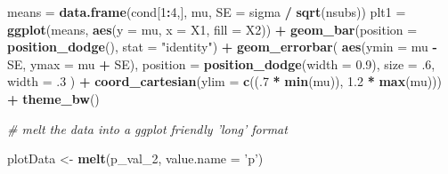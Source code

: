 \documentclass[]{book}
\newenvironment{Shaded}{\begin{snugshade}}{\end{snugshade}}
\newcommand{\CommentTok}[1]{\textcolor[rgb]{0.56,0.35,0.01}{\textit{#1}}}
\newcommand{\DataTypeTok}[1]{\textcolor[rgb]{0.13,0.29,0.53}{#1}}
\newcommand{\DecValTok}[1]{\textcolor[rgb]{0.00,0.00,0.81}{#1}}
\newcommand{\FloatTok}[1]{\textcolor[rgb]{0.00,0.00,0.81}{#1}}
\newcommand{\KeywordTok}[1]{\textcolor[rgb]{0.13,0.29,0.53}{\textbf{#1}}}
\newcommand{\NormalTok}[1]{#1}
\newcommand{\OperatorTok}[1]{\textcolor[rgb]{0.81,0.36,0.00}{\textbf{#1}}}
\newcommand{\StringTok}[1]{\textcolor[rgb]{0.31,0.60,0.02}{#1}}
\begin{document}
\begin{Shaded}
\begin{Highlighting}[]
\NormalTok{means =}\StringTok{ }\KeywordTok{data.frame}\NormalTok{(cond[}\DecValTok{1}\OperatorTok{:}\DecValTok{4}\NormalTok{,], mu, }\DataTypeTok{SE =}\NormalTok{ sigma }\OperatorTok{/}\StringTok{ }\KeywordTok{sqrt}\NormalTok{(nsubs))}
\NormalTok{plt1 =}\StringTok{ }\KeywordTok{ggplot}\NormalTok{(means, }\KeywordTok{aes}\NormalTok{(}\DataTypeTok{y =}\NormalTok{ mu, }\DataTypeTok{x =}\NormalTok{ X1, }\DataTypeTok{fill =}\NormalTok{ X2)) }\OperatorTok{+}
\KeywordTok{geom_bar}\NormalTok{(}\DataTypeTok{position =} \KeywordTok{position_dodge}\NormalTok{(), }\DataTypeTok{stat =} \StringTok{"identity"}\NormalTok{) }\OperatorTok{+}
\KeywordTok{geom_errorbar}\NormalTok{(}
\KeywordTok{aes}\NormalTok{(}\DataTypeTok{ymin =}\NormalTok{ mu }\OperatorTok{-}\StringTok{ }\NormalTok{SE, }\DataTypeTok{ymax =}\NormalTok{ mu }\OperatorTok{+}\StringTok{ }\NormalTok{SE),}
\DataTypeTok{position =} \KeywordTok{position_dodge}\NormalTok{(}\DataTypeTok{width =} \FloatTok{0.9}\NormalTok{),}
\DataTypeTok{size =} \FloatTok{.6}\NormalTok{,}
\DataTypeTok{width =} \FloatTok{.3}
\NormalTok{) }\OperatorTok{+}
\KeywordTok{coord_cartesian}\NormalTok{(}\DataTypeTok{ylim =} \KeywordTok{c}\NormalTok{((.}\DecValTok{7} \OperatorTok{*}\StringTok{ }\KeywordTok{min}\NormalTok{(mu)), }\FloatTok{1.2} \OperatorTok{*}\StringTok{ }\KeywordTok{max}\NormalTok{(mu))) }\OperatorTok{+}
\KeywordTok{theme_bw}\NormalTok{()}
 
\CommentTok{# melt the data into a ggplot friendly 'long' format}

\NormalTok{plotData <-}\StringTok{ }\KeywordTok{melt}\NormalTok{(p_val_}\DecValTok{2}\NormalTok{, }\DataTypeTok{value.name =} \StringTok{'p'}\NormalTok{)}
 

\end{Highlighting}
\end{Shaded}
\end{document}
